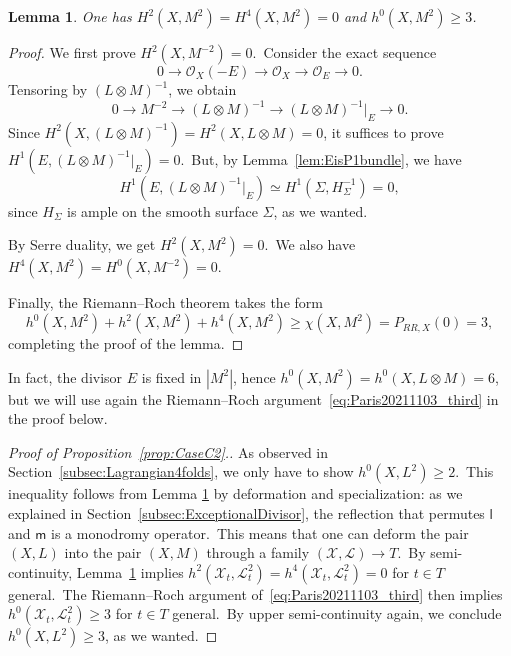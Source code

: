 \documentclass[12pt]{amsart}
\def\cL{\mathscr{L}}
\def\cO{\mathscr{O}}
\def\cX{\mathscr{X}}
\def\otp{}
\def\isom{\simeq}
\newtheorem{lemm}{Lemma}[section]
\theoremstyle{remark}
\def\lll{\ensuremath{\mathsf l}}
\def\mm{\ensuremath{\mathsf m}}
\begin{document}
\begin{lemm}\label{levanh2}
One has $H^2(X, M^{\otp 2})=H^4(X, M^{\otp 2})=0$ and $h^0(X, M^{\otp 2})\ge3$.
\end{lemm}

\begin{proof}
We first prove $H^2(X, M^{-2})=0$.\
Consider the exact sequence
\begin{equation*}
0\to \cO_X(-E)\to \cO_X\to \cO_E\to 0.
\end{equation*}
Tensoring by $(L\otimes M)^{\otp -1}$, we obtain
\begin{equation*}
0\to  M^{-2}\to (L\otimes M)^{\otp -1}\to (L\otimes M)^{\otp -1}\vert_E\to 0.
\end{equation*}
Since $H^2(X,(L\otimes M)^{\otp -1})=H^2(X,L\otimes M)=0$, it  suffices to prove  $H^1(E,(L\otimes M)^{\otp -1}\vert_E)=0$.\
But, by Lemma~\ref{lem:EisP1bundle}, we have
\[
H^1(E,(L\otimes M)^{-1}\vert_E)\isom H^1(\Sigma, H_{\Sigma}^{-1})=0,
\]
since $H_{\Sigma}$ is ample on the smooth surface $\Sigma$, as we wanted.

By Serre duality, we get $H^2(X,M^{\otp 2})=0$.\
We also have $H^4(X,M^{\otp 2})=H^0(X,M^{\otp -2})=0$.

Finally, the Riemann--Roch theorem takes the form
\begin{equation}\label{eq:Paris20211103_third}
h^0(X,M^{\otp  2})+h^2(X,M^{\otp  2})+h^4(X,M^{\otp2})\geq \chi(X,M^{\otp  2})=P_{RR,X}(0)=3,
\end{equation}
completing the proof of the lemma.
\end{proof}

In fact, the divisor $E$ is fixed in $|M^{\otp 2}|$, hence $h^0(X,M^{\otp  2})= h^0(X,L\otimes M)=6$, but we will use again the Riemann--Roch argument~\eqref{eq:Paris20211103_third} in the proof below.

\begin{proof}[Proof of Proposition~\ref{prop:CaseC2}.]
As observed in Section~\ref{subsec:Lagrangian4folds}, we only have to show  $h^0(X,L^{\otp 2})\geq 2$.\
This inequality follows from Lemma \ref{levanh2} by deformation and specialization: as we explained in Section~\ref{subsec:ExceptionalDivisor}, the reflection that permutes $\lll$ and $\mm$ is a monodromy operator.\
This means that one can deform the pair $(X,L)$ into the pair $(X,M)$ through a family $(\cX,\cL)\to T$.\
By semi-continuity, Lemma~\ref{levanh2} implies $h^2(\cX_t, \cL_t^{\otp 2})=h^4(\cX_t, \cL_t^{\otp 2})=0$ for $t\in T$ general.\
The Riemann--Roch argument of~\eqref{eq:Paris20211103_third} then implies $h^0(\cX_t, \cL_t^{\otp 2})\geq 3$ for $t\in T$ general.\
By upper semi-continuity again, we conclude $h^0(X,L^{\otp 2})\geq 3$, as we wanted.
\end{proof}
\end{document}

